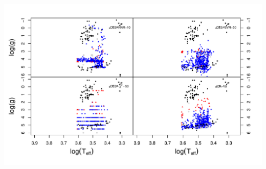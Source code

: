 \begin{appendix}
\begin {figure*}
 \centering
  \includegraphics[width=\textwidth]{figs/ipac-Cesseti.pdf}
  \caption{}
 \label{fig:ipac-ces}
\end {figure*}



\end{appendix}
